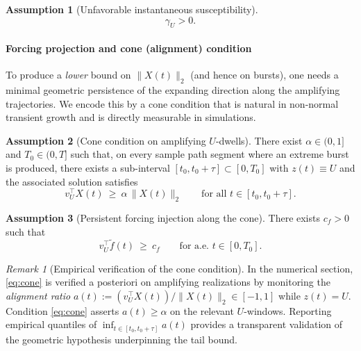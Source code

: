 \documentclass[12pt,a4paper]{article}
\theoremstyle{definition}
\newtheorem{assumption}{Assumption}
\theoremstyle{remark}
\newtheorem{remark}{Remark}
\begin{document}
\begin{assumption}[Unfavorable instantaneous susceptibility]\label{ass:gammaU_positive_cone}
	\begin{equation}\label{eq:gammaU_pos_cone}
		\gamma_U>0.
	\end{equation}
\end{assumption}

\paragraph{Forcing projection and cone (alignment) condition}
To produce a \emph{lower} bound on $\|X(t)\|_2$ (and hence on bursts), one needs a minimal geometric persistence of the expanding
direction along the amplifying trajectories. We encode this by a cone condition that is natural in non-normal transient growth
and is directly measurable in simulations.

\begin{assumption}[Cone condition on amplifying $U$-dwells]\label{ass:cone_condition}
	There exist $\alpha\in(0,1]$ and $T_0\in(0,T]$ such that, on every sample path segment where an extreme burst is produced,
	there exists a sub-interval $[t_0,t_0+\tau]\subset[0,T_0]$ with $z(t)\equiv U$ and the associated solution satisfies
	\begin{equation}\label{eq:cone}
		v_U^\top X(t)\ \ge\ \alpha\,\|X(t)\|_2
		\qquad \text{for all } t\in[t_0,t_0+\tau].
	\end{equation}
\end{assumption}

\begin{assumption}[Persistent forcing injection along the cone]\label{ass:forcing_in_cone}
	There exists $c_f>0$ such that
	\begin{equation}\label{eq:forcing_cone}
		v_U^\top \widetilde f(t)\ \ge\ c_f
		\qquad \text{for a.e.\ } t\in[0,T_0].
	\end{equation}
\end{assumption}

\begin{remark}[Empirical verification of the cone condition]\label{rem:cone_verification}
	In the numerical section, \eqref{eq:cone} is verified a posteriori on amplifying realizations by monitoring the
	\emph{alignment ratio} $a(t):=(v_U^\top X(t))/\|X(t)\|_2\in[-1,1]$ while $z(t)=U$.
	Condition \eqref{eq:cone} asserts $a(t)\ge \alpha$ on the relevant $U$-windows. Reporting empirical quantiles of
	$\inf_{t\in[t_0,t_0+\tau]} a(t)$ provides a transparent validation of the geometric hypothesis underpinning the tail bound.
\end{remark}
\end{document}
